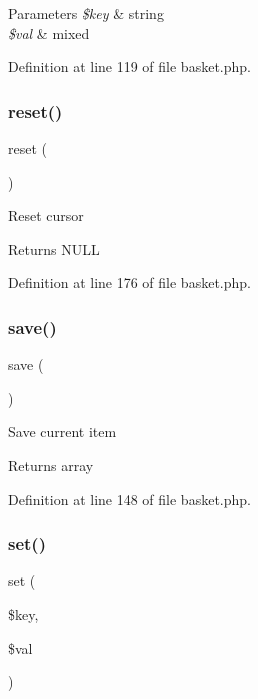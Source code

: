 \begin{DoxyParams}{Parameters}
{\em \$key} & string \\
\hline
{\em \$val} & mixed \\
\hline
\end{DoxyParams}


Definition at line 119 of file basket.\+php.

\hypertarget{class_basket_a4a20559544fdf4dcb457e258dc976cf8}{}\label{class_basket_a4a20559544fdf4dcb457e258dc976cf8} 
\subsubsection{\texorpdfstring{reset()}{reset()}}
{\footnotesize\ttfamily reset (\begin{DoxyParamCaption}{ }\end{DoxyParamCaption})}

Reset cursor \begin{DoxyReturn}{Returns}
N\+U\+LL 
\end{DoxyReturn}


Definition at line 176 of file basket.\+php.

\hypertarget{class_basket_afc8a3c62679cf00ade9f15fb2a6d6132}{}\label{class_basket_afc8a3c62679cf00ade9f15fb2a6d6132} 
\subsubsection{\texorpdfstring{save()}{save()}}
{\footnotesize\ttfamily save (\begin{DoxyParamCaption}{ }\end{DoxyParamCaption})}

Save current item \begin{DoxyReturn}{Returns}
array 
\end{DoxyReturn}


Definition at line 148 of file basket.\+php.

\hypertarget{class_basket_ac8d8012023e560c81f55a629022cb65a}{}\label{class_basket_ac8d8012023e560c81f55a629022cb65a} 
\subsubsection{\texorpdfstring{set()}{set()}}
{\footnotesize\ttfamily set (\begin{DoxyParamCaption}\item[{}]{\$key,  }\item[{}]{\$val }\end{DoxyParamCaption})}

